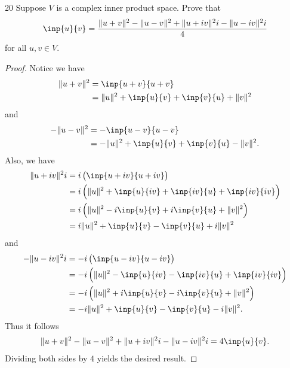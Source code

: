 \documentclass{extarticle}
\newenvironment{problem}[1]{\begin{prob*}{#1}{}}{\end{prob*}}
\newcommand{\F}{\mathbb{F}}
\DeclarePairedDelimiter\Mod{\lvert}{\rvert}
\DeclarePairedDelimiter\Norm{\lVert}{\rVert}
\begin{document}
\begin{problem}{20}
Suppose $V$ is a complex inner product space.  Prove that
\begin{equation*}
\inp{u}{v} = \frac{\Norm{u+v}^2 - \Norm{u - v}^2 + \Norm{u + iv}^2i - \Norm{u -iv}^2i}{4}
\end{equation*}
for all $u,v\in V$.
\end{problem}
\begin{proof}
Notice we have
\begin{align*}
\Norm{u + v}^2 &= \inp{u + v}{u + v}\\
&=\Norm{u}^2 +\inp{u}{v} + \inp{v}{u} + \Norm{v}^2
\end{align*}
and
\begin{align*}
-\Norm{u - v}^2 &= -\inp{u - v}{u - v}\\
&=-\Norm{u}^2 + \inp{u}{v} + \inp{v}{u} - \Norm{v}^2.
\end{align*}
Also, we have
\begin{align*}
\Norm{u + iv}^2i &= i\left(\inp{u + iv}{u+iv}\right)\\
&= i\left(\Norm{u}^2 + \inp{u}{iv} + \inp{iv}{u} + \inp{iv}{iv}\right)\\
&= i\left(\Norm{u}^2 - i\inp{u}{v} + i\inp{v}{u} + \Norm{v}^2\right)\\
&= i\Norm{u}^2 + \inp{u}{v} - \inp{v}{u} + i\Norm{v}^2
\end{align*}
and
\begin{align*}
-\Norm{u - iv}^2i &= -i\left(\inp{u - iv}{u-iv}\right)\\
&= -i\left(\Norm{u}^2 - \inp{u}{iv} - \inp{iv}{u} + \inp{iv}{iv}\right)\\
&= -i\left(\Norm{u}^2 + i\inp{u}{v} - i\inp{v}{u} + \Norm{v}^2\right)\\
&= -i\Norm{u}^2 + \inp{u}{v} - \inp{v}{u} - i\Norm{v}^2.
\end{align*}
Thus it follows
\begin{align*}
\Norm{u+v}^2 - \Norm{u - v}^2 + \Norm{u + iv}^2i - \Norm{u -iv}^2i = 4\inp{u}{v}.
\end{align*}
Dividing both sides by $4$ yields the desired result.
\end{proof}

\end{document}
